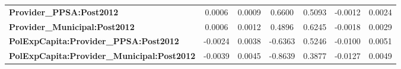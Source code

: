 \begin{center}
\begin{tabular}{lcccccc}
\textbf{Provider\_PPSA:Post2012}                   &       0.0006       &       0.0009       &      0.6600     &      0.5093      &      -0.0012      &       0.0024       \\
\textbf{Provider\_Municipal:Post2012}              &       0.0006       &       0.0012       &      0.4896     &      0.6245      &      -0.0018      &       0.0029       \\
\textbf{PolExpCapita:Provider\_PPSA:Post2012}      &      -0.0024       &       0.0038       &     -0.6363     &      0.5246      &      -0.0100      &       0.0051       \\
\textbf{PolExpCapita:Provider\_Municipal:Post2012} &      -0.0039       &       0.0045       &     -0.8639     &      0.3877      &      -0.0127      &       0.0049       \\
\bottomrule
\end{tabular}
\end{center}